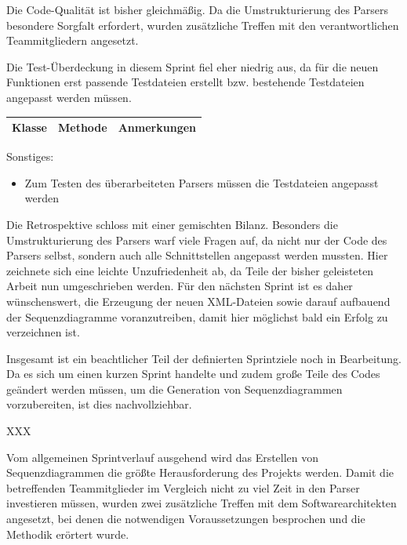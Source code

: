 Die Code-Qualität ist bisher gleichmäßig. Da die Umstrukturierung des Parsers besondere Sorgfalt erfordert, wurden zusätzliche Treffen mit den verantwortlichen Teammitgliedern angesetzt.
\nsecend%

Die Test-Überdeckung in diesem Sprint fiel eher niedrig aus, da für die neuen Funktionen erst passende Testdateien erstellt bzw. bestehende Testdateien angepasst werden müssen.
\nsecend%

\begin{table}[H]

\begin{tabularx}{\textwidth}{ |l|l|X| }
\hline
\textbf{Klasse} & \textbf{Methode} & \textbf{Anmerkungen}\\
 \hline
\hline
\end{tabularx}
\end{table}

Sonstiges:
\begin{itemize}
\item Zum Testen des überarbeiteten Parsers müssen die Testdateien angepasst werden
\end{itemize}
\nsecend%

Die Retrospektive schloss mit einer gemischten Bilanz. Besonders die Umstrukturierung des Parsers warf viele Fragen auf, da nicht nur der Code des Parsers selbst, sondern auch alle Schnittstellen angepasst werden mussten. Hier zeichnete sich eine leichte Unzufriedenheit ab, da Teile der bisher geleisteten Arbeit nun umgeschrieben werden. Für den nächsten Sprint ist es daher wünschenswert, die Erzeugung der neuen XML-Dateien sowie darauf aufbauend der Sequenzdiagramme voranzutreiben, damit hier möglichst bald ein Erfolg zu verzeichnen ist.
\nsecend%

Insgesamt ist ein beachtlicher Teil der definierten Sprintziele noch in Bearbeitung. Da es sich um einen kurzen Sprint handelte und zudem große Teile des Codes geändert werden müssen, um die Generation von Sequenzdiagrammen vorzubereiten, ist dies nachvollziehbar. 
\nsecend%

XXX
\nsecend%

Vom allgemeinen Sprintverlauf ausgehend wird das Erstellen von Sequenzdiagrammen die größte Herausforderung des Projekts werden. Damit die betreffenden Teammitglieder im Vergleich nicht zu viel Zeit in den Parser investieren müssen, wurden zwei zusätzliche Treffen mit dem Softwarearchitekten angesetzt, bei denen die notwendigen Voraussetzungen besprochen und die Methodik erörtert wurde.
\nsecend%
